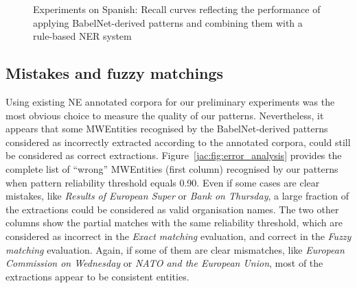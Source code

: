 \documentclass[output=paper]{langsci/langscibook}
\begin{document}
\begin{figure}[p]
\caption{Experiments on Spanish: Recall curves reflecting the performance of applying BabelNet-derived patterns and combining them with a rule-based NER system}
\label{jac:fig:eval_patterns_spanish_recall}
\end{figure}
\clearpage


\subsection{Mistakes and fuzzy matchings}
Using existing NE annotated corpora for our preliminary experiments was the most obvious choice to measure the quality of our patterns. Nevertheless, it appears that some MWEntities recognised by the BabelNet-derived patterns considered as incorrectly extracted according to the annotated corpora, could still be considered as correct extractions.
Figure~\ref{jac:fig:error_analysis} provides the complete list of ``wrong'' MWEntities (first column) recognised by our patterns when pattern reliability threshold equals 0.90. Even if some cases are clear mistakes, like \textit{Results of European Super} or \textit{Bank on Thursday}, a large fraction of the extractions could be considered as valid organisation names. The two other columns show the partial matches with the same reliability threshold, which are considered as incorrect in the \emph{Exact matching} evaluation, and correct in the \emph{Fuzzy matching} evaluation. Again, if some of them are clear mismatches, like \textit{European Commission on Wednesday} or \textit{NATO and the European Union}, most of the extractions appear to be consistent entities.
\end{document}

